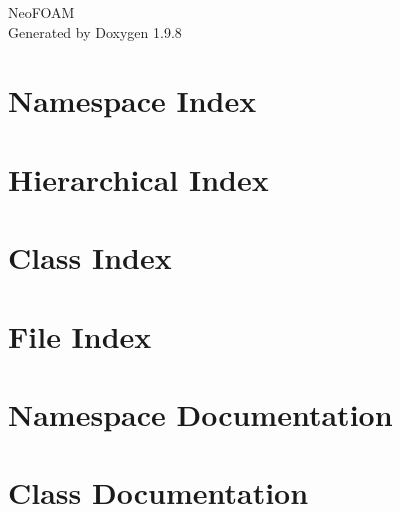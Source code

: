 \documentclass[twoside]{book}
\newcommand{\+}{\discretionary{\mbox{\scriptsize$\hookleftarrow$}}{}{}}
\newcommand{\clearemptydoublepage}{%
    \newpage{\pagestyle{empty}\cleardoublepage}%
  }
\begin{document}
  \raggedbottom
    \hypersetup{pageanchor=false,
                bookmarksnumbered=true,
                pdfencoding=unicode
               }
  \begin{titlepage}
  \vspace*{7cm}
  \begin{center}%
  {\Large Neo\+FOAM}\\
  \vspace*{1cm}
  {\large Generated by Doxygen 1.9.8}\\
  \end{center}
  \end{titlepage}
  \clearemptydoublepage
  \tableofcontents
  \clearemptydoublepage
  \hypersetup{pageanchor=true}
\chapter{Namespace Index}

\chapter{Hierarchical Index}

\chapter{Class Index}

\chapter{File Index}

\chapter{Namespace Documentation}


\chapter{Class Documentation}















\end{document}
